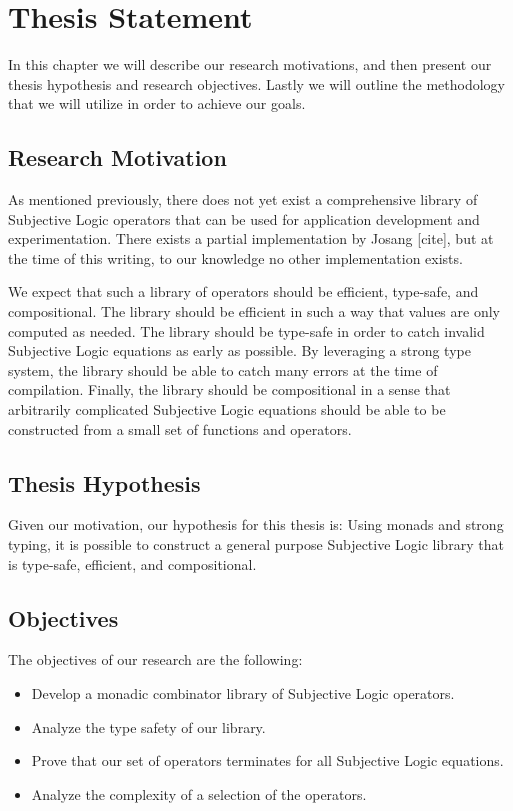 \documentclass[thesis.tex]{subfiles}
\begin{document}
\chapter{Thesis Statement}
\label{chap:thesis-statement}

In this chapter we will describe our research motivations, and then present our thesis hypothesis and
research objectives. Lastly we will outline the methodology that we will utilize in order to
achieve our goals.


\section{Research Motivation}

As mentioned previously, there does not yet exist a comprehensive library of Subjective
Logic operators that can be used for application development and experimentation. There
exists a partial implementation by Josang [cite], but at the time of this writing, to our
knowledge no other implementation exists.

We expect that such a library of operators should be efficient, type-safe, and compositional.
The library should be efficient in such a way that values are only computed as needed. The
library should be type-safe in order to catch invalid Subjective Logic equations as early as
possible. By leveraging a strong type system, the library should be able to catch many errors
at the time of compilation. Finally, the library should be compositional in a sense that
arbitrarily complicated Subjective Logic equations should be able to be constructed from a
small set of functions and operators.


\section{Thesis Hypothesis}

Given our motivation, our hypothesis for this thesis is: Using monads and strong typing, it is
possible to construct a general purpose Subjective Logic library that is type-safe, efficient,
and compositional.


\section{Objectives}

The objectives of our research are the following:

\begin{itemize}
  \item Develop a monadic combinator library of Subjective Logic operators.
  \item Analyze the type safety of our library.
  \item Prove that our set of operators terminates for all Subjective Logic equations.
  \item Analyze the complexity of a selection of the operators.
\end{itemize}
\end{document}
